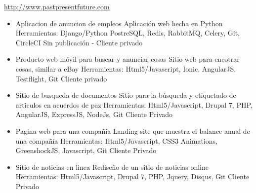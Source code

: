\documentclass[11pt,a4paper]{moderncv}
\begin{document}
{
    \url{http://www.pastpresentfuture.com}
    \begin{itemize}
        \item Aplicacion de anuncion de empleos
            \newline{}
            Aplicación web hecha en Python
            \newline{}
            Herramientas: Django/Python PostreSQL, Redis, RabbitMQ, Celery, Git, CircleCI
            \newline{}
            Sin publicación - Cliente privado
            \newline{}
        \item Producto web móvil para buscar y anunciar cosas
            \newline{}
            Sitio web para encotrar cosas, similar a eBay
            \newline{}
            Herramientas: Html5/Javascript, Ionic, AngularJS, Testflight, Git
            \newline{}
            Cliente privado
            \newline{}
        \item Sitio de busqueda de documentos
            \newline{}
            Sitio para la búsqueda y etiquetado de articulos en acuerdos de paz
            \newline{}
            Herramientas: Html5/Javascript, Drupal 7, PHP, AngularJS, ExpressJS, NodeJs, Git
            \newline{}
            Cliente Privado
            \newline{}
        \item Pagina web para una compañía
            \newline{}
            Landing site que muestra el balance anual de una compañía 
            \newline{}
            Herramientas: Html5/Javascript, CSS3 Animations, GreenshockJS, Javascript, Git
            \newline{}
            Cliente Privado
            \newline{}
        \item Sitio de noticias en linea
            \newline{}
            Rediseño de un sitio de noticias online
            \newline{}
            Herramientas: Html5/Javascript, Drupal 7, PHP, Jquery, Disqus, Git
            \newline{}
            Cliente Privado
            \newline{}
    \end{itemize}
}
\end{document}
